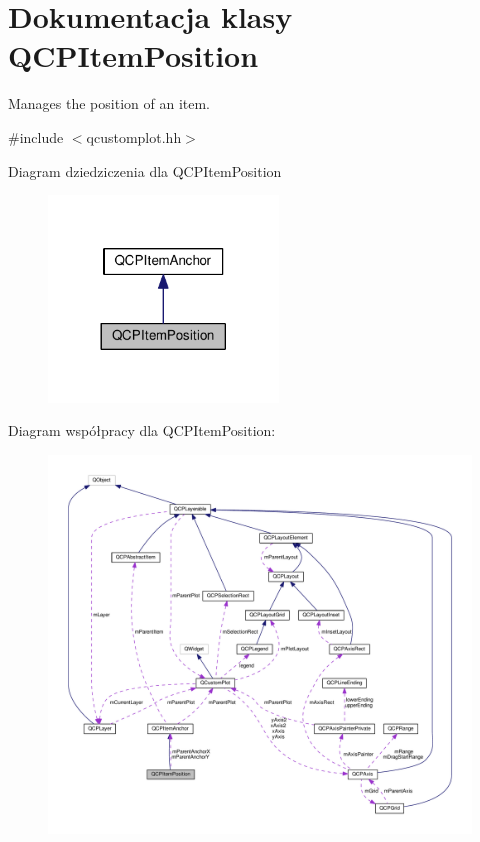 \hypertarget{class_q_c_p_item_position}{}\section{Dokumentacja klasy Q\+C\+P\+Item\+Position}
\label{class_q_c_p_item_position}


Manages the position of an item.  




{\ttfamily \#include $<$qcustomplot.\+hh$>$}



Diagram dziedziczenia dla Q\+C\+P\+Item\+Position\nopagebreak
\begin{figure}[H]
\begin{center}
\leavevmode
\includegraphics[width=173pt]{class_q_c_p_item_position__inherit__graph}
\end{center}
\end{figure}


Diagram współpracy dla Q\+C\+P\+Item\+Position\+:\nopagebreak
\begin{figure}[H]
\begin{center}
\leavevmode
\includegraphics[width=350pt]{class_q_c_p_item_position__coll__graph}
\end{center}
\end{figure}
